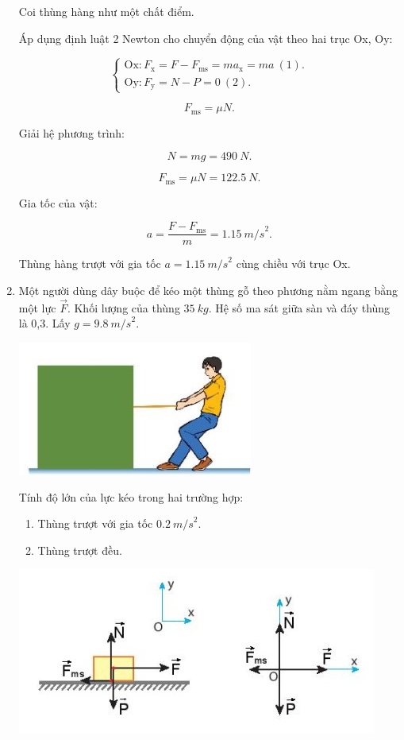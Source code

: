 \begin{enumerate}[label=\bfseries Câu \arabic*:]
{		Coi thùng hàng như một chất điểm.
		
		Áp dụng định luật 2 Newton cho chuyển động của vật theo hai trục Ox, Oy:
		
		$$\begin{cases}
			\text{Ox}: F_\text{x} = F - F_\text{ms} = ma_\text{x} = ma\ (1).\\
			\text{Oy}: F_\text{y} = N - P = 0\ (2).
		\end{cases}$$
	
		$$F_\text{ms} = \mu N.$$
		
		Giải hệ phương trình:
		
		$$N = mg = \SI{490}{N}.$$
		
		$$F_\text{ms} = \mu N = \SI{122,5}{N}.$$
		
		Gia tốc của vật:
		
		$$a = \dfrac{F - F_\text{ms}}{m} = \SI{1,15}{m/s}^2.$$
		
		Thùng hàng trượt với gia tốc $a = \SI{1,15}{m/s}^2$ cùng chiều với trục Ox.
	
		
	
	}
	
	\item {}
	
	
	{Một người dùng dây buộc để kéo một thùng gỗ theo phương nằm ngang bằng một lực $\vec F$. Khối lượng của thùng $\SI{35}{kg}$. Hệ số ma sát giữa sàn và đáy thùng là 0,3. Lấy $g=\SI{9,8}{m/s}^2$.
		\begin{center}
			\includegraphics[scale=1]{../figs/VN10-2022-PH-TP021-2.jpg}
		\end{center}
	
	Tính độ lớn của lực kéo trong hai trường hợp:
	\begin{enumerate}[label=\alph*)]
		\item  Thùng trượt với gia tốc $\SI{0,2}{m/s}^2$.
		\item Thùng trượt đều.
	\end{enumerate}
	}
	
	\hideall
	{
	\begin{center}
		\includegraphics[scale=1]{../figs/VN10-2022-PH-TP021-1.jpg}
	\end{center}

}
\end{enumerate}
